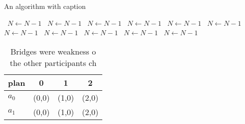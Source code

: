 \documentclass[a4paper]{article}
\begin{document}
\begin{algorithm}
\caption{An algorithm with caption}
\begin{algorithmic}
\    \State $N \gets N - 1$
\    \State $N \gets N - 1$
\    \State $N \gets N - 1$
\    \State $N \gets N - 1$
\    \State $N \gets N - 1$
\    \State $N \gets N - 1$
\    \State $N \gets N - 1$
\    \State $N \gets N - 1$
\    \State $N \gets N - 1$
\    \State $N \gets N - 1$
\    \State $N \gets N - 1$
\EndWhile
\end{algorithmic}
\end{algorithm}

\begin{table}
\begin{adjustbox}{width=0.6\columnwidth}
\begin{tabular}{|l|l|l|l|}
\hline
\textbf{plan} & \multicolumn{1}{c|}{\textbf{0}} & \multicolumn{1}{c|}{\textbf{1}} & \multicolumn{1}{c|}{\textbf{2}} \\ \hline
\textbf{$a_0$}  & (0,0) & (1,0) & (2,0) \\ \hline
\textbf{$a_1$}  & (0,0) & (1,0) & (2,0) \\ \hline
\end{tabular}
\end{adjustbox}
\caption{Bridges were weakness o the other participants ch
}
\end{table}
\end{document}
